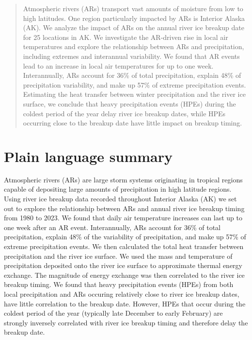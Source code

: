 \documentclass[12pts,draft]{AR_analysis_}
\begin{document}
\begin{abstract}
	
	Atmospheric rivers (ARs) transport vast amounts of moisture 
	from low to high latitudes. One region particularly 
	impacted by ARs is Interior Alaska (AK). We analyze the impact 
	of ARs on the annual river ice breakup date for 25 locations 
	in AK. We investigate the AR-driven rise in local air temperatures 
	and explore the relationship between ARs and precipitation, 
	including extremes and interannual variability. We found that 
	AR events lead to an increase in local air temperatures
	for up to one week. Interannually, ARs account 
	for 36\% of total precipitation, explain 48\% of precipitation 
	variability, and make up 57\% of extreme precipitation events. 
	Estimating the heat transfer between winter precipitation
	and the river ice surface, we 
	conclude that heavy precipitation events (HPEs) during the 
	coldest period of the year delay river ice breakup dates, 
	while HPEs occurring close to the breakup date have little 
	impact on breakup timing.

\end{abstract}


\section*{Plain language summary}

	Atmospheric rivers (ARs) are large storm systems originating in
	tropical regions capable of depositing large amounts of
	precipitation in high latitude regions. 
	Using river ice breakup data recorded throughout Interior
	Alaska (AK) we set out to explore the relationship between
	ARs and annual river ice breakup timing from 1980 to 2023. 
	We found that 
	daily air temperature increases can last up to
	one week after an AR event. Interannually, ARs
	account for 36\% of total precipitation, 
	explain 48\% of the variability of precipitation, and make up 57\% 
	of extreme precipitation events. We then
	calculated the total heat transfer between precipitation 
	and the river ice surface. We used the mass and temperature 
	of precipitation deposited onto the river ice surface to approximate 
	thermal energy exchange. The magnitude of energy exchange was then
	correlated to the river ice breakup timing. We found that heavy 
	precipitation events (HPEs)
	from both local precipitation and ARs occuring relatively close to
	river ice breakup dates, have little correlation to the breakup
	date. However, HPEs that occur during the coldest period of the
	year (typically late December to early February) are strongly inversely
	correlated with river ice breakup timing and therefore delay
	the breakup date.
\end{document}
